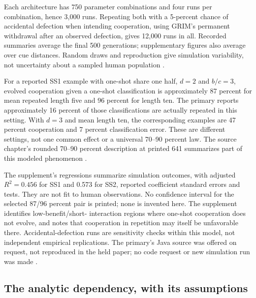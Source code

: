 Each architecture has 750 parameter combinations and four runs per
combination, hence 3,000 runs. Repeating both with a 5-percent chance
of accidental defection when intending cooperation, using GRIM's
permanent withdrawal after an observed defection, gives 12,000 runs
in all. Recorded summaries average the final 500 generations; supplementary
figures also average over cue distances. Random draws and reproduction
give simulation variability, not uncertainty about a sampled human
population \cite[SI~pp.~1--3]{DeltonEtAl2011Reciprocity}.

For a reported SS1 example with one-shot share one half, \(d=2\)
and \(b/c=3\), evolved cooperation given a one-shot classification
is approximately 87 percent for mean repeated length five and 96
percent for length ten. The primary reports approximately 16 percent
of those classifications are actually repeated in this setting.
With \(d=3\) and mean length ten, the corresponding examples are
47 percent cooperation and 7 percent classification error. These
are different settings, not one common effect or a universal 70--90
percent law. The source chapter's rounded 70--90 percent description
at printed 641 summarizes part of this modeled phenomenon
\cite[p.~13338]{DeltonEtAl2011Reciprocity}.

The supplement's regressions summarize simulation outcomes, with
adjusted \(R^2=0.456\) for SS1 and 0.573 for SS2, reported coefficient
standard errors and tests. They are not fit to human observations.
No confidence interval for the selected 87/96 percent pair is printed;
none is invented here. The supplement identifies low-benefit/short-
interaction regions where one-shot cooperation does not evolve, and
notes that cooperation in repetition may itself be unfavorable there.
Accidental-defection runs are sensitivity checks within this model,
not independent empirical replications. The primary's Java source was
offered on request, not reproduced in the held paper; no code request
or new simulation run was made
\cite[p.~13336 n.; SI~pp.~2--3, 5--9]{DeltonEtAl2011Reciprocity}.

\subsection{The analytic dependency, with its assumptions}

